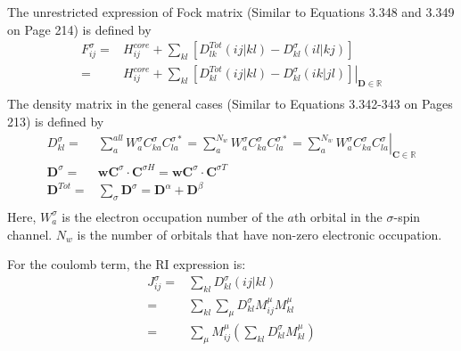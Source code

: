 \documentclass[a4paper,12pt]{article}
\begin{document}
The unrestricted expression of Fock matrix (Similar to Equations 3.348 and 3.349 on Page 214) is defined by 
\begin{equation}
	\begin{split}
	    F_{ij}^{\sigma}=&H_{ij}^{core}+\sum_{kl}\left[D_{lk}^{\textit{Tot}}\left( ij|kl \right)-D_{kl}^{\sigma}\left(il|kj  \right)\right] \\
		=&H_{ij}^{core}+\left.\sum_{kl}\left[D_{kl}^{\textit{Tot}}\left( ij|kl \right)
		    -D_{kl}^{\sigma}\left(ik|jl  \right)\right]\right|_{\textbf{D} \in \mathbb{R}} \\
	\end{split}
\end{equation}
The density matrix in the general cases (Similar to Equations 3.342-343 on Pages 213) is defined by 
\begin{equation}
	\begin{split}
		D_{kl}^{\sigma}=&\sum_{a}^{all}W_{a}^{\sigma}C_{ka}^{\sigma}C_{la}^{\sigma*}=\sum_{a}^{N_w}W_{a}^{\sigma}C_{ka}^{\sigma}C_{la}^{\sigma*}
		=\left.\sum_{a}^{N_w}W_{a}^{\sigma}C_{ka}^{\sigma}C_{la}^{\sigma}\right|_{\textbf{C}\in\mathbb{R}}\\
		\textbf{D}^{\sigma} = &\textbf{wC}^{\sigma}\cdot \textbf{C}^{\sigma H}=\textbf{wC}^{\sigma}\cdot \textbf{C}^{\sigma T}\\
		\textbf{D}^{\textit{Tot}} = &\sum_{\sigma}\textbf{D}^{\sigma}=\textbf{D}^{\alpha}+\textbf{D}^{\beta}\\
    \end{split}
\end{equation}
Here, $W_{a}^{\sigma}$ is the electron occupation number of the $a$th orbital in the $\sigma$-spin channel.
$N_w$ is the number of orbitals that have non-zero electronic occupation.

For the coulomb term, the RI expression is:
\begin{equation}
	\begin{split}
		J_{ij}^{\sigma} = &\sum_{kl}D_{kl}^{\sigma}\left( ij|kl \right)\\
		= &\sum_{kl}\sum_{\mu}D_{kl}^{\sigma}M_{ij}^{\mu}M_{kl}^{\mu}\\
		= &\sum_{\mu}M_{ij}^{\mu}\left(\sum_{kl}D_{kl}^{\sigma}M_{kl}^{\mu}  \right)\\
	\end{split}
\end{equation}
\end{document}
